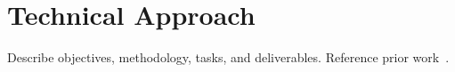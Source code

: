\chapter{Technical Approach}
\label{chap:tech-approach}

Describe objectives, methodology, tasks, and deliverables.  Reference prior work~\cite{doe2020}.
